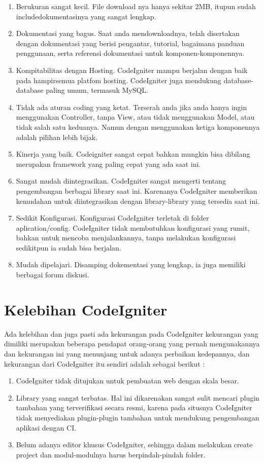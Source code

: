 \begin{enumerate}
\item Berukuran sangat kecil. File download nya hanya sekitar 2MB, itupun sudah includedokumentasinya yang sangat lengkap.
\item Dokumentasi yang bagus. Saat anda mendownloadnya, telah disertakan dengan dokumentasi yang berisi pengantar, tutorial, bagaimana panduan penggunaan, serta referensi dokumentasi untuk komponen-komponennya.
\item Kompitabilitas dengan Hosting. CodeIgniter mampu berjalan dengan baik pada hampirsemua platfom hosting. CodeIgniter juga mendukung database-database paling umum, termasuk MySQL.
\item Tidak ada aturan coding yang ketat. Terserah anda jika anda hanya ingin menggunakan Controller, tanpa View, atau tidak menggunakan Model, atau tidak salah satu keduanya. Namun dengan menggunakan ketiga komponennya adalah pilihan lebih bijak.
\item Kinerja yang baik. Codeigniter sangat cepat bahkan mungkin bisa dibilang merupakan framework yang paling cepat yang ada saat ini.
\item Sangat mudah diintegrasikan. CodeIgniter sangat mengerti tentang pengembangan berbagai library saat ini. Karenanya CodeIgniter memberikan kemudahan untuk diintegrasikan dengan library-library yang tersedia saat ini.
\item Sedikit Konfigurasi. Konfigurasi CodeIgniter terletak di folder aplication/config. CodeIgniter tidak membutuhkan konfigurasi yang rumit, bahkan untuk mencoba menjalankannya, tanpa melakukan konfigurasi sedikitpun ia sudah bisa berjalan.
\item Mudah dipelajari. Disamping dokementasi yang lengkap, ia juga memiliki berbagai forum diskusi.
\end{enumerate}  

\section{Kelebihan CodeIgniter}
Ada kelebihan dan juga pasti ada kekurangan pada CodeIgniter kekurangan yang dimiliki merupakan beberapa pendapat orang-orang yang pernah mengunakannya dan kekurangan ini yang menunjang untuk adanya perbaikan kedepannya, dan kekurangan dari CodeIgniter itu sendiri adalah sebagai berikut :

\begin{enumerate}
\item CodeIgniter tidak ditujukan untuk pembuatan web dengan skala besar.
\item Library yang sangat terbatas. Hal ini dikarenakan sangat sulit mencari plugin tambahan yang terverifikasi secara resmi, karena pada situsnya CodeIgniter tidak menyediakan plugin-plugin tambahan untuk mendukung pengembangan aplikasi dengan CI.
\item Belum adanya editor khusus CodeIgniter, sehingga dalam melakukan create project dan modul-modulnya harus berpindah-pindah folder.
\end{enumerate}  